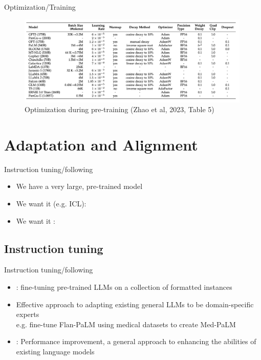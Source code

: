 \documentclass[10pt]{beamer}
\begin{document}
\begin{frame}{Optimization/Training}

\begin{figure}[h]
\centering
\includegraphics[width=0.99\textwidth]{fig/zhou_2023_tab5}
\caption{Optimization during pre-training (Zhao et al, 2023, Table 5)}
\end{figure}

\end{frame}




\section{Adaptation and Alignment}

\begin{frame}{Instruction tuning/following}

\begin{itemize}
\item We have a very large, pre-trained model
\item We want it  (e.g. ICL): 
\item We want it : 
\end{itemize}
\end{frame}


\subsection{Instruction tuning}

\begin{frame}{Instruction tuning/following}

\begin{itemize}
\item {}: fine-tuning pre-trained LLMs on a collection of formatted instances
\pause
\item Effective approach to adapting existing general LLMs to be domain-specific experts\\
e.g. fine-tune Flan-PaLM using medical datasets to create Med-PaLM
\pause
\item {}: Performance improvement, a general approach to enhancing the abilities of existing language models
\end{itemize}

\end{frame}
\end{document}
